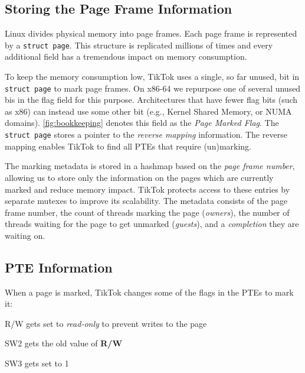\documentclass[conference]{IEEEtran}
\newcommand{\sysname}{TikTok}
\begin{document}
\subsection{Storing the Page Frame Information}
\label{subsec:frameinfo}
Linux divides physical memory into page frames. Each page frame is represented
by a \texttt{struct page}. This structure is replicated millions of times and
every additional field has a tremendous impact on memory consumption.

To keep the memory consumption low, \sysname{} uses a single, so far unused, bit
in \texttt{struct page} to mark page frames. On x86-64 we repurpose one of
several unused bis in the flag field for this purpose.
Architectures that have fewer flag bits (such as x86) can instead use some other
bit (e.g., Kernel Shared Memory, or NUMA domains). 
\autoref{fig:bookkeeping} denotes this field as the \emph{Page Marked Flag}.
The \texttt{struct page} stores a pointer to the \emph{reverse mapping}
information. The reverse mapping enables \sysname{} to find all PTEs that
require (un)marking.

The marking metadata is stored in a hashmap based on the \emph{page frame
number}, allowing us to store only the information on the pages which are
currently marked and reduce memory impact. \sysname{} protects access to these
entries by separate mutexes to improve its scalability. The metadata consists of
the page frame number, the count of threads marking the page (\emph{owners}),
the number of threads waiting for the page to get unmarked (\emph{guests}), and
a \emph{completion} they are waiting on. 


\subsection{PTE Information} \label{subsec:pageinfo}

When a page is marked, \sysname{} changes some of the flags in the PTEs to mark
it:

\begin{LaTeXdescription}
  \item[R/W] gets set to \emph{read-only} to prevent writes to the page
  \item[SW2] gets the old value of \textbf{R/W}
  \item[SW3] gets set to 1
\end{LaTeXdescription}
\end{document}

